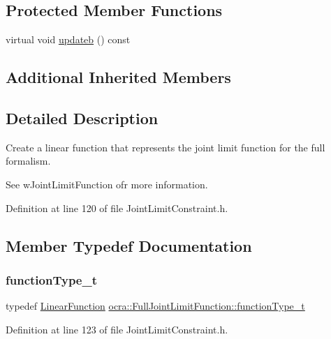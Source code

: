 \subsection*{Protected Member Functions}
\begin{DoxyCompactItemize}
\item 
virtual void \hyperlink{classocra_1_1FullJointLimitFunction_a3c9bcab2026535cc5f2c0176552d449d}{updateb} () const
\end{DoxyCompactItemize}
\subsection*{Additional Inherited Members}


\subsection{Detailed Description}
Create a linear function that represents the joint limit function for the full formalism. 

See w\+Joint\+Limit\+Function ofr more information. 

Definition at line 120 of file Joint\+Limit\+Constraint.\+h.



\subsection{Member Typedef Documentation}
\hypertarget{classocra_1_1FullJointLimitFunction_a3ae743a316981d67933248a9d58f58fb}{}\label{classocra_1_1FullJointLimitFunction_a3ae743a316981d67933248a9d58f58fb} 
\subsubsection{\texorpdfstring{function\+Type\+\_\+t}{functionType\_t}}
{\footnotesize\ttfamily typedef \hyperlink{classocra_1_1LinearFunction}{Linear\+Function} \hyperlink{classocra_1_1FullJointLimitFunction_a3ae743a316981d67933248a9d58f58fb}{ocra\+::\+Full\+Joint\+Limit\+Function\+::function\+Type\+\_\+t}}



Definition at line 123 of file Joint\+Limit\+Constraint.\+h.



